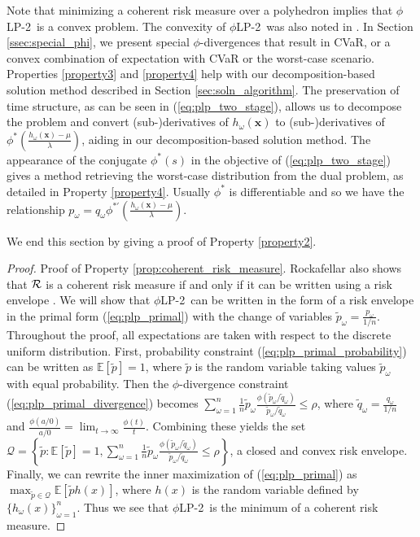 \documentclass[ijoc,letterpaper]{informs3} %
\newcommand{\E}{\mathbb{E}}
\newcommand{\e}[1]{\E \left[ #1 \right]}
\newcommand{\x}{\mathbf{x}}
\newcommand{\plp}{$\phi$LP-2}
\begin{document}
\noindent Note that minimizing a coherent risk measure over a polyhedron implies that \plp\ is a convex problem.
The convexity of \plp\ was also noted in \citep{bental2011robust}.
In Section \ref{ssec:special_phi}, we present special $\phi$-divergences that result in CVaR, or a convex combination of expectation with CVaR or the worst-case scenario. 
Properties \ref{property3} and \ref{property4} help with our decomposition-based solution method described in Section \ref{sec:soln_algorithm}. 
The preservation of time structure, as can be seen in (\ref{eq:plp_two_stage}), allows us to decompose the problem and convert (sub-)derivatives of $h_\omega(\x)$ to (sub-)derivatives of $\phi^*\left(\frac{h_\omega(\x) - \mu}{\lambda}\right)$, aiding in our decomposition-based solution method. 
The appearance of the conjugate $\phi^*(s)$ in the objective of (\ref{eq:plp_two_stage}) gives a method retrieving the worst-case distribution from the dual problem, as detailed in Property \ref{property4}.  
Usually $\phi^*$ is differentiable and so we have the relationship $p_\omega = q_\omega \phi^{* \prime}(\frac{h_\omega(\x)-\mu}{\lambda})$. 

We end this section by giving a proof of Property \ref{property2}. 


\begin{proof}{\sc Proof of Property \ref{prop:coherent_risk_measure}.}
	Rockafellar also shows that $\cal R$ is a coherent risk measure if and only if it can be written using a risk envelope \cite{rockafellar2007coherent}.
	We will show that \plp\ can be written in the form of a risk envelope in the primal form (\ref{eq:plp_primal}) with the change of variables $\tilde{p}_\omega = \frac{p_\omega}{1/n}$.
	Throughout the proof, all expectations are taken with respect to the discrete uniform distribution.
	First, probability constraint (\ref{eq:plp_primal_probability}) can be written as $\e{\tilde{p}} = 1$, where $\tilde{p}$ is the random variable taking values $\tilde{p}_\omega$ with equal probability.
	Then the $\phi$-divergence constraint (\ref{eq:plp_primal_divergence}) becomes $\sum_{\omega=1}^n \frac{1}{n} \tilde{p}_\omega \frac{\phi\left(\tilde{p}_\omega/\tilde{q}_\omega\right)}{\tilde{p}_\omega/\tilde{q}_\omega} \leq \rho$, where $\tilde{q}_\omega = \frac{q_\omega}{1/n}$ and $\frac{\phi(a/0)}{a/0} = \lim_{t \rightarrow \infty} \frac{\phi(t)}{t}$.
	Combining these yields the set $\mathcal{Q} = \left\{\tilde{p} : \e{\tilde{p}} = 1, \sum_{\omega=1}^n \frac{1}{n} \tilde{p}_\omega \frac{\phi\left(\tilde{p}_\omega/\tilde{q}_\omega\right)}{\tilde{p}_\omega/\tilde{q}_\omega} \leq \rho \right\}$, a closed and convex risk envelope.
	Finally, we can rewrite the inner maximization of (\ref{eq:plp_primal}) as $\max_{\tilde{p} \in \mathcal{Q}} \e{\tilde{p} h(x)}$, where $h(x)$ is the random variable defined by $\{h_\omega(x)\}_{\omega=1}^n$.
	Thus we see that \plp\ is the minimum of a coherent risk measure.
	\Halmos
\end{proof}
\end{document}
